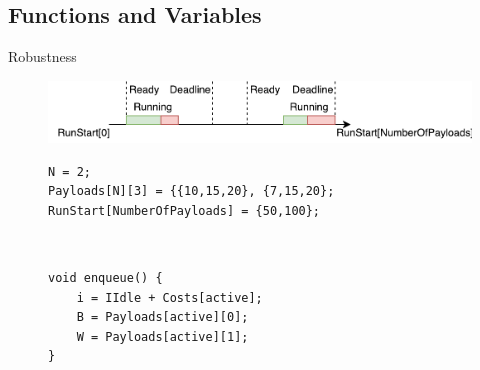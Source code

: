 \subsection{Functions and Variables}
\begin{frame}[fragile]{Robustness}{\insertsubsection}
	\centering
	\begin{figure}[h]
		\includegraphics[width=1\textwidth]{graphics/payload_execution}
	\end{figure}
	\begin{figure}[h]
		\begin{minipage}{.7\textwidth}
		\begin{lstlisting}
N = 2;
Payloads[N][3] = {{10,15,20}, {7,15,20};
RunStart[NumberOfPayloads] = {50,100};
		\end{lstlisting}
		\end{minipage}\\
		\begin{minipage}{.7\textwidth}
			\begin{lstlisting}
void enqueue() {
    i = IIdle + Costs[active];
    B = Payloads[active][0];
    W = Payloads[active][1];
}
			\end{lstlisting}
		\end{minipage}
	\end{figure}
\end{frame}

